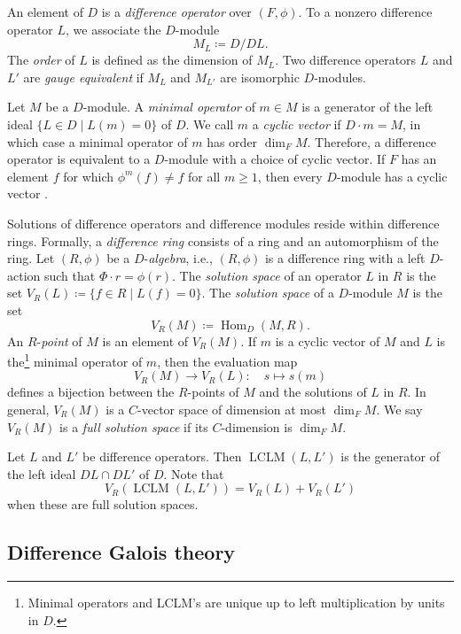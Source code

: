 \documentclass[11pt,reqno]{amsart}
\makeatletter
\theoremstyle{definition}
\DeclareMathOperator{\LCLM}{LCLM}
\DeclareMathOperator{\Hom}{Hom}
\newcommand\footnoteref[1]{\protected@xdef\@thefnmark{\ref{#1}}\@footnotemark}
\makeatother
\begin{document}
An element of $D$ is a \emph{difference operator} over $(F,\phi)$. 
To a nonzero difference operator $L$, we associate the $D$-module
\[
    M_L\coloneqq D/DL.
\]
The \emph{order} of $L$ is defined as the dimension of $M_{L}$.
Two difference operators $L$ and $L'$ are \emph{gauge equivalent} if $M_L$ and $M_{L'}$ are isomorphic $D$-modules.

Let $M$ be a $D$-module. 
A \emph{minimal operator} of $m\in M$ is a 
generator of the left ideal $\{L\in D\mid L(m)=0\}$ of $D$. 
We call $m$ a \emph{cyclic vector} if $D\cdot m=M$, in which case a minimal operator of $m$ has order $\dim_{F}M$.
Therefore, a difference operator is equivalent to a $D$-module with a choice of cyclic vector.
If $F$ has an element $f$ for which $\phi^{m}(f)\neq f$ for all $m\ge 1$, then every $D$-module has a cyclic vector \cite[Theorem B.2]{hendricks1999solving}.

Solutions of difference operators and difference modules reside within difference rings.
Formally, a \emph{difference ring} consists of a ring and an automorphism of the ring. 
Let $(R,\phi)$ be a $D$-\emph{algebra}, i.e., $(R,\phi)$ is a difference ring with a left $D$-action such that $\Phi\cdot r=\phi(r)$.
The \emph{solution space} of an operator $L$ in $R$ is the set $V_{R}(L)\coloneqq \{f\in R\mid L(f)=0\}$. 
The \emph{solution space} of a $D$-module $M$ is the set
\[
    V_{R}(M)\coloneqq \Hom_{D}(M,R).
\]
An $R$-\emph{point} of $M$ is an element of $V_{R}(M)$. 
If $m$ is a cyclic vector of $M$ and $L$ is the\footnote{\label{note1} Minimal operators and LCLM's are unique up to left multiplication by units in $D$.} minimal operator of $m$, then the evaluation map
\[
    V_{R}(M)\to V_{R}(L)\colon\quad s\mapsto s (m)
\]
defines a bijection between the $R$-points of $M$ and the solutions of $L$ in $R$. 
In general, $V_{R}(M)$ is a $C$-vector space of dimension at most $\dim_{F} M$. We say $V_{R}(M)$ is a \emph{full solution space} if its $C$-dimension is $\dim_{F} M$.

Let $L$ and $L'$ be difference operators. 
Then $\LCLM(L,L')$ is the\footnoteref{note1} generator of the left ideal $DL\cap DL'$ of $D$. 
Note that 
\[
    V_{R}(\LCLM(L,L'))=V_{R}(L)+ V_{R}(L')
\]
when these are full solution spaces.

\subsection{Difference Galois theory}
\label{subsection:picard-vessiot}
\end{document}
